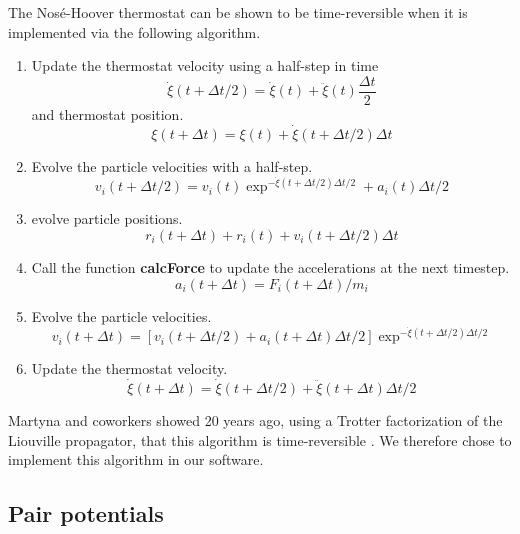 \documentclass[12pt]{article}
\begin{document}
The Nos\'{e}-Hoover thermostat can be shown to be time-reversible when it is implemented via the following algorithm.
\begin{enumerate}
\item Update the thermostat velocity using a half-step in time
\begin{equation}
\dot{\xi} (t+ \Delta t/2) = \dot{\xi}(t) + \ddot{\xi}(t) \frac{\Delta t}{2}
\end{equation}
and thermostat position.
\begin{equation}
\xi (t+ \Delta t) = \xi(t) + \dot{\xi}(t+\Delta t/2)\Delta t
\end{equation}
\item Evolve the particle velocities with a half-step.
\begin{equation}
v_i (t+\Delta t/2) = v_i (t) \exp^{-\dot{\xi}(t+\Delta t/2) \Delta t/2} + a_{i} (t) \Delta t/2
\end{equation}
\item evolve particle positions.
\begin{equation}
r_{i} (t+\Delta t) + r_{i} (t) + v_{i}(t+ \Delta t/2) \Delta t
\end{equation}
\item Call the function \textbf{calcForce} to update the accelerations at the next timestep.
\begin{equation}
a_{i} (t+\Delta t) = F_{i} (t+ \Delta t)/m_{i}
\end{equation}
\item Evolve the particle velocities.
\begin{equation}
v_{i} (t+ \Delta t)  = [v_{i}(t+\Delta t/2) + a_{i}(t+\Delta t) \Delta t/2]\exp^{-\dot{\xi}(t+\Delta t/2) \Delta t/2}
\end{equation}
\item Update the thermostat velocity.
\begin{equation}
\dot{\xi}(t+\Delta t) = \dot{\xi} (t+\Delta t/2) + \ddot{\xi} (t+\Delta t) \Delta t /2
\end{equation}
\end{enumerate}
Martyna and coworkers showed 20 years ago, using a Trotter factorization of the Liouville propagator, that this algorithm is time-reversible \cite{Tuckerman1992}.
%
We therefore chose to implement this algorithm in our software.

\subsection{Pair potentials} \label{subsec:potential}
\end{document}
